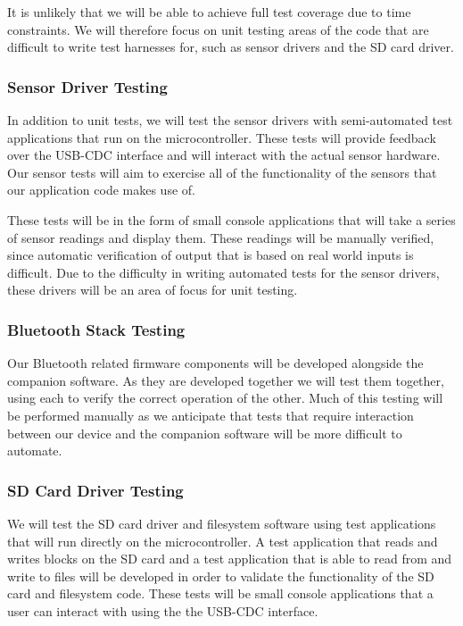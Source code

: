 It is unlikely that we will be able to achieve full test coverage due to time
constraints. We will therefore focus on unit testing areas of the code that
are difficult to write test harnesses for, such as sensor drivers and the SD
card driver.

\subsubsection{Sensor Driver Testing}

In addition to unit tests, we will test the sensor drivers with semi-automated
test applications that run on the microcontroller. These tests will provide
feedback over the USB-CDC interface and will interact with the actual sensor
hardware.  Our sensor tests will aim to exercise all of the functionality of the
sensors that our application code makes use of.

These tests will be in the form of small console applications that will take
a series of sensor readings and display them. These readings will be manually
verified, since automatic verification of output that is based on real world
inputs is difficult. Due to the difficulty in writing automated tests for the
sensor drivers, these drivers will be an area of focus for unit testing.

\subsubsection{Bluetooth Stack Testing}

Our Bluetooth related firmware components will be developed alongside the
companion software. As they are developed together we will test them together,
using each to verify the correct operation of the other. Much of this testing
will be performed manually as we anticipate that tests that require interaction
between our device and the companion software will be more difficult to
automate.

\subsubsection{SD Card Driver Testing}

We will test the SD card driver and filesystem software using test applications
that will run directly on the microcontroller. A test application that reads
and writes blocks on the SD card and a test application that is able to read
from and write to files will be developed in order to validate the functionality
of the SD card and filesystem code. These tests will be small console
applications that a user can interact with using the the USB-CDC interface.

